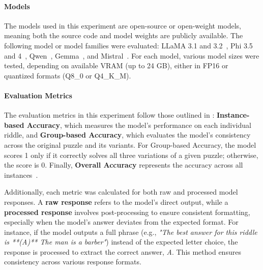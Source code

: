 \paragraph{Models}
The models used in this experiment are open-source or open-weight models, meaning both the source code and model weights are publicly available. The following model or model families were evaluated: \ac{LLaMA} 3.1 and 3.2~\cite{grattafioriLlama3Herd2024}, \acs{Phi} 3.5 and 4~\cite{abdinPhi3TechnicalReport2024, abdinPhi4TechnicalReport2024}, \acs{Qwen}~\cite{qwenQwen25TechnicalReport2025}, \acs{Gemma}~\cite{teamGemma2Improving2024}, and \acs{Mistral}~\cite{MistralNeMoMistral}. For each model, various model sizes were tested, depending on available VRAM (up to 24 GB), either in FP16 or quantized formats (Q8\_0 or Q4\_K\_M).

\paragraph{Evaluation Metrics}
The evaluation metrics in this experiment follow those outlined in : \textbf{Instance-based Accuracy}, which measures the model's performance on each individual riddle, and \textbf{Group-based Accuracy}, which evaluates the model’s consistency across the original puzzle and its variants. For Group-based Accuracy, the model scores 1 only if it correctly solves all three variations of a given puzzle; otherwise, the score is 0. Finally, \textbf{Overall Accuracy} represents the accuracy across all instances~\cite{jiangBRAINTEASERLateralThinking2023}.

Additionally, each metric was calculated for both raw and processed model responses. A \textbf{raw response} refers to the model's direct output, while a \textbf{processed response} involves post-processing to ensure consistent formatting, especially when the model’s answer deviates from the expected format. For instance, if the model outputs a full phrase (e.g., \textit{"The best answer for this riddle is **(A)** The man is a barber"}) instead of the expected letter choice, the response is processed to extract the correct answer, \textit{A}. This method ensures consistency across various response formats.
